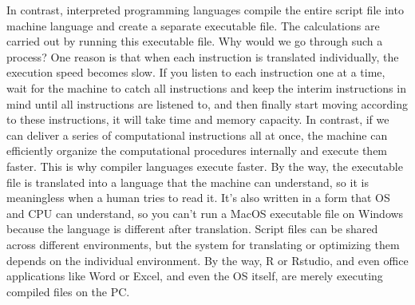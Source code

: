 \documentclass{ltjsbook}
\begin{document}
In contrast, interpreted programming languages compile the entire script file into machine language and create a separate executable file. The calculations are carried out by running this executable file. Why would we go through such a process? One reason is that when each instruction is translated individually, the execution speed becomes slow. If you listen to each instruction one at a time, wait for the machine to catch all instructions and keep the interim instructions in mind until all instructions are listened to, and then finally start moving according to these instructions, it will take time and memory capacity. In contrast, if we can deliver a series of computational instructions all at once, the machine can efficiently organize the computational procedures internally and execute them faster. This is why compiler languages execute faster. By the way, the executable file is translated into a language that the machine can understand, so it is meaningless when a human tries to read it. It's also written in a form that OS and CPU can understand, so you can't run a MacOS executable file on Windows because the language is different after translation. Script files can be shared across different environments, but the system for translating or optimizing them depends on the individual environment. By the way, R or Rstudio, and even office applications like Word or Excel, and even the OS itself, are merely executing compiled files on the PC.
\end{document}
